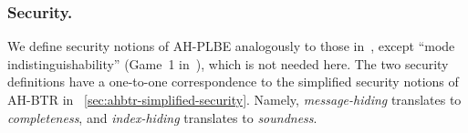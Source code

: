\subsubsection{Security.}
We define security notions of AH-PLBE analogously to those in~\cite{EC:BonSahWat06}, except ``mode indistinguishability'' (Game~1 in~\cite{EC:BonSahWat06}), which is not needed here.
The two security definitions have a one-to-one correspondence to the simplified security notions of AH-BTR in \Section~\ref{sec:ahbtr-simplified-security}.
Namely, \emph{message-hiding} translates to \emph{completeness}, and
\emph{index-hiding} translates to \emph{soundness}.
